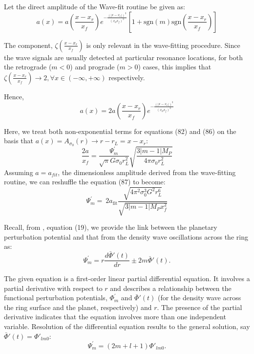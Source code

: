 \documentclass{article}
\begin{document}
\vspace{5pt}

Let the direct amplitude of the Wave-fit routine be given as:
\begin{equation}
    a(x) = a(\frac{x-x_{r}}{x_{f}})e^{-\frac{(|x-x_{r}|)^{3}}{(x_{d}x_{f})^{3}}}[1 + \mathrm{sgn}(m) \mathrm{sgn}(\frac{x-x_{r}}{x_{f}})]
\end{equation}

The component, $\zeta(\frac{x-x_{r}}{x_{f}})$ is only relevant in the wave-fitting procedure. Since the wave signals are usually detected at particular resonance locations, for both the retrograde ($m<0$) and prograde ($m>0$) cases, this implies that $\zeta(\frac{x-x_{r}}{x_{f}}) \rightarrow 2, \forall  x \in (-\infty,+\infty)$ respectively.

Hence,
\begin{equation}
    a(x) = 2a(\frac{x-x_{r}}{x_{f}})e^{-\frac{(|x-x_{r}|)^{3}}{(x_{d}x_{f})^{3}}}
\end{equation}

Here, we treat both non-exponential terms for equations (82) and (86) on the basis that $a(x) = A_{\sigma_{0}}(r) \rightarrow r-r_{L} = x-x_{r}$:
\begin{equation}
    \frac{2a}{x_{f}} = \frac{\Psi^{'}_{m}}{\sqrt{\pi} G\sigma_{0}r_{L}^{2}}\sqrt{\frac{3|m-1|M_{P}}{4\pi\sigma_{0}r_{L}^{2}}}
\end{equation}
Assuming $a = a_{fit}$, the dimensionless amplitude derived from the wave-fitting routine, we can reshuffle the equation (87) to become:
\begin{equation}
   \Psi^{'}_{m} = \ 2a_{\text{fit}} \frac{\sqrt{4\pi^{2}\sigma_{0}^{3}G^{2}r_{L}^{6}}}{\sqrt{3|m-1|M_{P} x_{f}^{2}}}
\end{equation}

Recall, from \cite{Marley1993PlanetaryAM}, equation (19), we provide the link between the planetary perturbation potential and that from the density wave oscillations across the ring as:
\begin{equation}
    \Psi^{'}_{m} = r \frac{d \bar{\Phi}{'}(t)}{dr} \pm 2m\bar{\Phi}{'}(t).
\end{equation}

The given equation is a first-order linear partial differential equation. It involves a partial derivative with respect to $r$ and describes a relationship between the functional perturbation potentials, $\Phi^{'}_{m}$ and $\bar{\Phi}{'}(t)$ (for the density wave across the ring surface and the planet, respectively) and $r$. The presence of the partial derivative indicates that the equation involves more than one independent variable. Resolution of the differential equation results to the general solution, say $\bar{\Phi}{'}(t) = \Phi{'}_{lm0}$:
\begin{equation}
   \Psi^{'}_{m} = (2m +l+1)\Phi{'}_{lm0}.
\end{equation}
\end{document}
